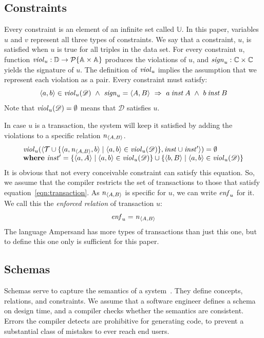 \documentclass[runningheads]{llncs}
\newcommand{\id}[1]{\text{\it #1\/}}
\newcommand{\instance}{\mathbin{\id{inst}}}
\newcommand{\viol}[2]{\violC{#1}(#2)}
\newcommand{\violC}[1]{\id{viol}_{#1}}
\newcommand{\sign}[1]{\id{sign}_{#1}}
\newcommand{\enfRel}[1]{\id{enf}_{#1}}
\newcommand{\powerset}[1]{\cal{P}\{#1\}}
\newcommand{\declare}[3]{\id{#1}_{\pair{#2}{#3}}}
\newcommand{\pair}[2]{\langle{#1},{#2}\rangle}
\newcommand{\Pair}[2]{#1\times#2}
\newcommand{\triple}[3]{\langle{#1},{#2},{#3}\rangle}
\newcommand{\Atoms}{\mathbb{A}}
\newcommand{\Concepts}{\mathbb{C}}
\newcommand{\triples}{\mathcal{T}}
\newcommand{\Constraints}{\mathbb{U}}
\newcommand{\dataset}{\mathscr{D}}
\newcommand{\Dataset}{\mathbb{D}}
\begin{document}
\subsection{Constraints}
\label{sct:Constraints}
   Every constraint is an element of an infinite set called $\Constraints$.
   In this paper, variables $u$ and $v$ represent all three types of constraints.
   We say that a constraint, $u$, is satisfied when $u$ is true for all triples in the data set.
   For every constraint $u$, function $\violC{u}:\Dataset\rightarrow\powerset{\Pair{\Atoms}{\Atoms}}$ produces the violations of $u$,
   and $\sign{u}:\Pair{\Concepts}{\Concepts}$ yields the signature of $u$.
   The definition of $\violC{u}$ implies the assumption that we represent each violation as a pair.
   Every constraint must satisfy:
\begin{equation}
   \pair{a}{b}\in\viol{u}{\dataset}\ \wedge\ \sign{u}=\pair{A}{B}\ \Rightarrow\ a\instance A\ \wedge\ b\instance B
\label{eqn:wellTypedViolation}
\end{equation}
   Note that $\viol{u}{\dataset}=\emptyset$ means that $\dataset$ satisfies $u$.

   In case $u$ is a transaction,
   the system will keep it satisfied by adding the violations to a specific relation $\declare{n}{A}{B}$.
\begin{equation}
   \begin{array}[t]{l}
      \viol{u}{\pair{\triples\cup\{\triple{a}{\declare{n}{A}{B}}{b}\mid\pair{a}{b}\in\viol{u}{\dataset}\}}{\instance\cup\instance'}}=\emptyset\\
      \text{\bf where}\ \instance'=\{ \pair{a}{A}\mid\pair{a}{b}\in\viol{u}{\dataset}\}\cup\{ \pair{b}{B}\mid\pair{a}{b}\in\viol{u}{\dataset}\}
   \end{array}
\label{eqn:transaction}
\end{equation}
   It is obvious that not every conceivable constraint can satisfy this equation.
   So, we assume that the compiler restricts the set of transactions to those that satisfy equation~\ref{eqn:transaction}.
   As $\declare{n}{A}{B}$ is specific for $u$, we can write $\enfRel{u}$ for it.
   We call this the {\em enforced relation} of transaction $u$:
\begin{equation}
   \enfRel{u}=\declare{n}{A}{B}
\end{equation}
   The language Ampersand has more types of transactions than just this one,
   but to define this one only is sufficient for this paper.

\subsection{Schemas}
\label{sct:Schemas}
   Schemas serve to capture the semantics of a system~\cite{Spivak2012}.
   They define concepts, relations, and constraints.
   We assume that a software engineer defines a schema on design time, and a compiler checks whether the semantics are consistent.
   Errors the compiler detects are prohibitive for generating code,
   to prevent a substantial class of mistakes to ever reach end users.
\end{document}
